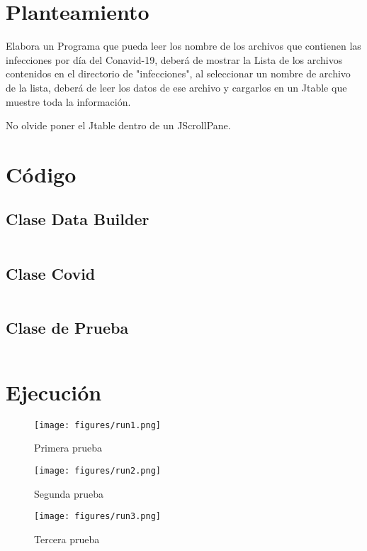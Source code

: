 \documentclass[12pt]{article}
\author{Pablo Vargas Bermúdez}
\begin{document}
\pagestyle{empty}


\section*{Planteamiento}
Elabora un Programa que pueda leer los nombre de los archivos que
contienen las infecciones por día del Conavid-19, deberá de mostrar la
Lista de los archivos contenidos en el directorio de "infecciones", al
seleccionar un nombre de archivo de la lista, deberá de leer los datos
de ese archivo y cargarlos en un Jtable que muestre toda la
información.

No olvide poner el Jtable dentro de un JScrollPane.

\section*{Código}

\subsection*{Clase Data Builder}
\inputminted{Java}{DataBuilder.java}
\subsection*{Clase Covid}
\inputminted{Java}{Covid.java}
\subsection*{Clase de Prueba}
\inputminted{Java}{Prueba.java}

\section*{Ejecución}
\begin{figure}[ht]
  \centering
  \texttt{[image: figures/run1.png]}
  \caption{Primera prueba}
\end{figure}
\begin{figure}[ht]
  \centering
  \texttt{[image: figures/run2.png]}
  \caption{Segunda prueba}
\end{figure}
\begin{figure}[ht]
  \centering
  \texttt{[image: figures/run3.png]}
  \caption{Tercera prueba}
\end{figure}
\end{document}

